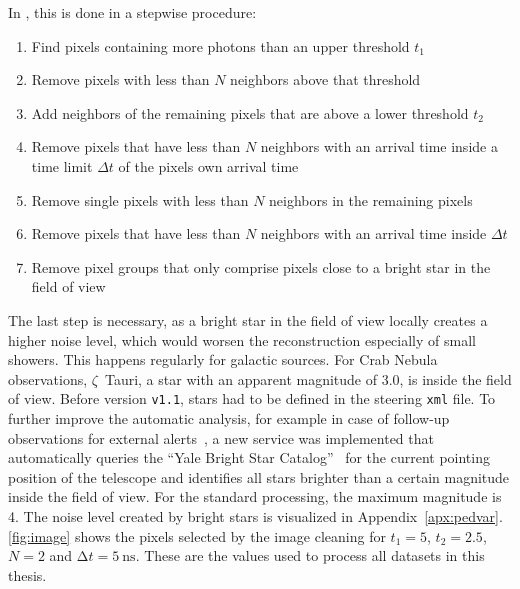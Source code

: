 In \facttools{}, this is done in a stepwise procedure:
\begin{enumerate}
  \item Find pixels containing more photons than an upper threshold $t_1$
  \item Remove pixels with less than $N$ neighbors above that threshold
  \item Add neighbors of the remaining pixels that are above a lower threshold $t_2$
  \item Remove pixels that have less than $N$ neighbors with an arrival time inside a time limit $\Delta t$ of the pixels own arrival time
  \item Remove single pixels with less than $N$ neighbors in the remaining pixels
  \item Remove pixels that have less than $N$ neighbors with an arrival time inside $\Delta t$
  \item Remove pixel groups that only comprise pixels close to a bright star in the field of view
\end{enumerate}
The last step is necessary, as a bright star in the field of view locally creates 
a higher noise level, which would worsen the reconstruction especially of small showers.
This happens regularly for galactic sources.
For Crab Nebula observations,
$\zeta$~Tauri, a star with an apparent magnitude of \num{3.0}, is inside the field of view.
Before \facttools{} version \texttt{v1.1}, stars had to be defined
in the steering \texttt{xml} file.
To further improve the automatic analysis, for example in case
of follow-up observations for external alerts~\cite{fact-followup}, a new service was implemented
that automatically queries the \enquote{Yale Bright Star Catalog}~\cite{yale_bright_star} for
the current pointing position of the telescope and identifies all stars brighter
than a certain magnitude inside the field of view.
For the standard processing, the maximum magnitude is 4.
The noise level created by bright stars is visualized in Appendix~\ref{apx:pedvar}.
\autoref{fig:image} shows the pixels selected by the image cleaning for $t_1=5$, $t_2=\num{2.5}$, 
$N=2$ and $\increment t = \SI{5}{\nano\second}$.
These are the values used to process all datasets in this thesis.


